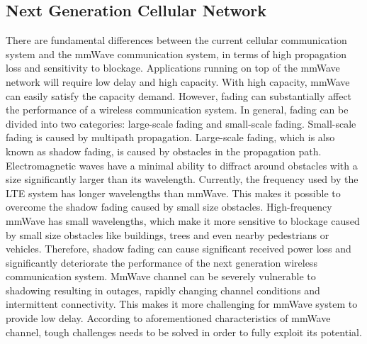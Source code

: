 \subsection{Next Generation Cellular Network}
\label{subsec:1}
\par There are fundamental differences between the current cellular communication system and the mmWave communication system, in terms of high propagation loss and sensitivity to blockage. Applications running on top of the mmWave network will require low delay and high capacity. With high capacity, mmWave can easily satisfy the capacity demand. However, fading can substantially affect the performance of a wireless communication system. In general, fading can be divided into two categories: large-scale fading and small-scale fading. Small-scale fading is caused by multipath propagation. Large-scale fading, which is also known as shadow fading, is caused by obstacles in the propagation path. Electromagnetic waves have a minimal ability to diffract around obstacles with a size significantly larger than its wavelength. Currently, the frequency used by the LTE system has longer wavelengths than mmWave. This makes it possible to overcome the shadow fading caused by small size obstacles. High-frequency mmWave has small wavelengths, which make it more sensitive to blockage caused by small size obstacles like buildings, trees and even nearby pedestrians or vehicles. Therefore, shadow fading  can cause significant received power loss and significantly deteriorate the performance of the next generation wireless communication system. MmWave channel can be severely vulnerable to shadowing resulting in outages, rapidly changing channel conditions and intermittent connectivity. This makes it more challenging for mmWave system to provide low delay. According to aforementioned characteristics of mmWave channel, tough challenges needs to be solved in order to fully exploit its potential. 


